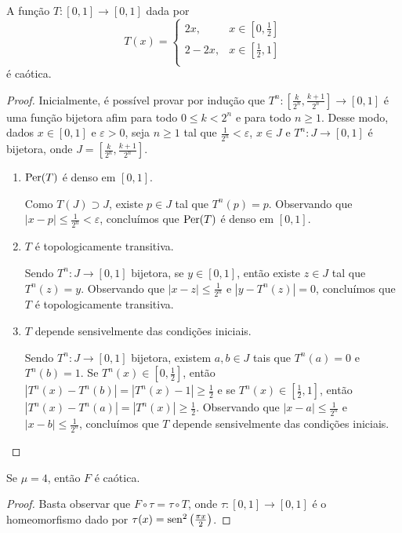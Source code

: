 \begin{lemma}
\label{lema conjugacaotopologica 1}
A função $T: [0,1] \to [0,1]$ dada por
\[ T(x) =
  \begin{cases}
    2x, & x \in [0, \frac{1}{2}] \\
    2 - 2x, & x \in [\frac{1}{2}, 1] \\
  \end{cases}
\]
é caótica.
\end{lemma}

\begin{proof}
Inicialmente, é possível provar por indução que $T^n: [\frac{k}{2^n}, \frac{k+1}{2^n}] \to [0,1]$ é uma função bijetora afim para todo $0 \leq k  < 2^n$ e para todo $n \geq 1$.
Desse modo, dados $x \in [0, 1]$ e $\varepsilon > 0$, seja $n \geq 1$ tal que $\frac{1}{2^n} < \varepsilon$, $x \in J$ e $T^n: J \to [0,1]$ é bijetora, onde $J = \left[\frac{k}{2^n}, \frac{k+1}{2^n}\right]$.

\begin{enumerate}[label=\alph*)]
\item $\operatorname{Per}(T)$ é denso em $[0, 1]$.

Como $T(J) \supset J$, existe $p \in J$ tal que $T^n(p) = p$. Observando que $|x-p| \leq \frac{1}{2^n} < \varepsilon$, concluímos que $\operatorname{Per}(T)$ é denso em $[0, 1]$.

\item $T$ é topologicamente transitiva.

Sendo $T^n: J \to [0,1]$ bijetora, se $y \in [0, 1]$, então existe $z \in J$ tal que $T^n(z) = y$.
Observando que $|x - z| \leq \frac{1}{2^n}$ e $|y - T^n(z)| = 0$, concluímos que $T$ é topologicamente transitiva.

\item $T$ depende sensivelmente das condições iniciais.

Sendo $T^n: J \to [0,1]$ bijetora, existem $a, b \in J$ tais que $T^n(a) = 0$ e $T^n(b) = 1$. Se $T^n(x) \in [0, \frac{1}{2}]$, então $|T^n(x) - T^n(b)| = |T^n(x) - 1| \geq \frac{1}{2}$ e se $T^n(x) \in [\frac{1}{2}, 1]$, então $|T^n(x) - T^n(a)| = |T^n(x)| \geq \frac{1}{2}$. Observando que $|x - a| \leq \frac{1}{2^n}$ e $|x - b| \leq \frac{1}{2^n}$, concluímos que $T$ depende sensivelmente das condições iniciais.
\end{enumerate}
\end{proof}

\begin{theorem}
Se $\mu = 4$, então $F$ é caótica.
\end{theorem}

\begin{proof}
Basta observar que $F \circ \tau = \tau \circ T$, onde $\tau: [0, 1] \to [0, 1]$ é o homeomorfismo dado por $\tau(x) = \operatorname{sen}^2\left(\frac{\pi x}{2}\right)$.
\end{proof}